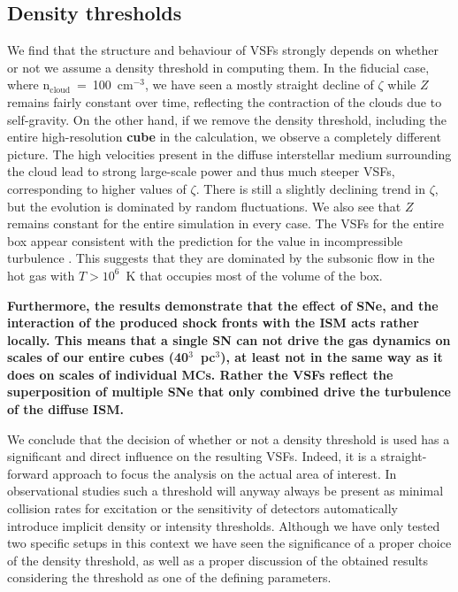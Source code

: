 \subsection{Density thresholds}\label{discussion:densthres}

We find that the structure and behaviour of VSFs strongly depends on whether or not we assume a density threshold in computing them.
In the fiducial case, where n$_\mathrm{cloud}$~=~100~cm$^{-3}$, we have seen a mostly straight decline of $\zeta$ while $Z$ remains fairly constant over time, reflecting the contraction of the clouds due to self-gravity.
On the other hand, if we remove the density threshold, including the entire high-resolution \textbf{cube} in the calculation, we observe a completely different picture.
The high velocities present in the diffuse interstellar medium surrounding the cloud lead to strong large-scale power and thus much steeper VSFs, corresponding to higher values of $\zeta$. 
There is still a slightly declining trend in $\zeta$, but the evolution is dominated by random fluctuations.
We also see that $Z$ remains constant for the entire simulation in every case.
The VSFs for the entire box appear consistent with the prediction for the value in incompressible turbulence \citep{Boldyrev2002}. 
This suggests that they are dominated by the subsonic flow in the hot gas with $T > 10^6$~K that occupies most of the volume of the box.

\textbf{
Furthermore, the results demonstrate that the effect of SNe, and the interaction of the produced shock fronts with the ISM acts rather locally. 
This means that a single SN can not drive the gas dynamics on scales of our entire cubes (40$^3$~pc$^3$), at least not in the same way as it does on scales of individual MCs.
Rather the VSFs reflect the superposition of multiple SNe that only combined drive the turbulence of the diffuse ISM.
}

We conclude that the decision of whether or not a density threshold is used has a significant and direct influence on the resulting VSFs.
Indeed, it is a straight-forward approach to focus the analysis on the actual area of interest.
In observational studies such a threshold will anyway always be present as minimal collision rates for excitation or the sensitivity of detectors automatically introduce implicit density or intensity thresholds. 
Although we have only tested two specific setups in this context we have seen the significance of a proper choice of the density threshold, as well as a proper discussion of the obtained results considering the threshold as one of the defining parameters.




